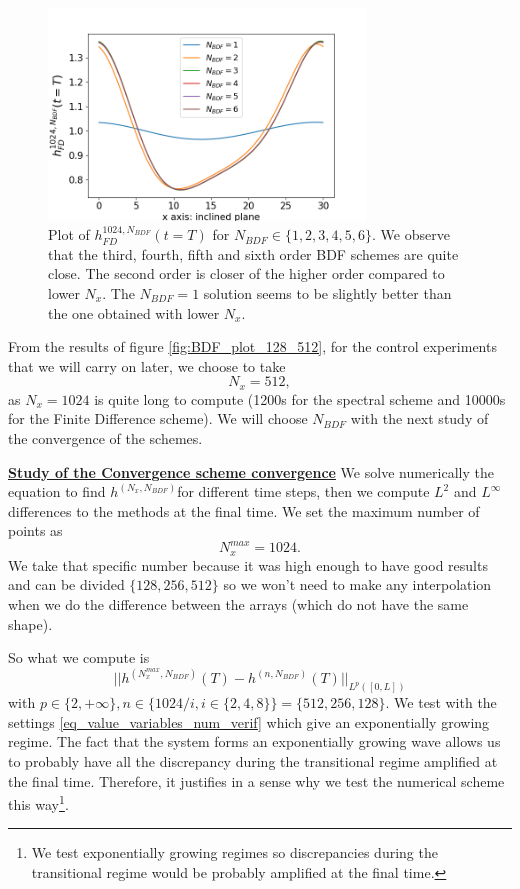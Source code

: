 \documentclass[12pt]{article}
\begin{document}
\begin{figure}[h]
\centering
\includegraphics[width=0.75\textwidth]{Verif_scheme/plot_FD_BDF_Nx_1024.png}
\caption{Plot of $h_{FD}^{1024, N_{BDF}}(t=T)$ for $N_{BDF} \in \{1, 2, 3, 4, 5, 6\}$.
We observe that the third, fourth, fifth and sixth order BDF schemes are quite close. The second order is closer of the higher order compared to lower $N_x$. The $N_{BDF}=1$ solution seems to be slightly better than the one obtained with lower $N_x$.}
\label{fig:BDF_plot_1024}
\end{figure}


 From the results of figure \ref{fig:BDF_plot_128_512}, for the control experiments that we will carry on later, we choose to take 
\begin{equation}
\boxed{
    N_x=512
    },
\end{equation}
as $N_x=1024$ is quite long to compute (1200s for the spectral scheme and 10000s for the Finite Difference scheme). 
We will choose $N_{BDF}$ with the next study of the convergence of the schemes.

\underline{\textbf{Study of the Convergence scheme convergence}}
We solve numerically the equation to find $h^{(N_x, N_{BDF})}$for different time steps, then we compute $L^2$ and $L^{\infty}$ differences to the methods at the final time. 
We set the maximum number of points as $$N_x^{max} = 1024.$$ We take that specific number because it was high enough to have good results and can be divided $\{128, 256, 512\}$ 
so we won't need to make any interpolation when we do the difference between the arrays (which do not have the same shape).
 
So what we compute is 
\begin{equation}\label{h_diff_convergence_rate}
    ||h^{(N_x^{max}, N_{BDF})}(T)-h^{(n, N_{BDF})}(T)||_{L^{p}([0,L])}
\end{equation}
with $p\in \{2, +\infty\},n\in \{1024/i, i\in \{2, 4, 8\}\} = \{512, 256, 128\}.$
We test with the settings \eqref{eq_value_variables_num_verif} which give an exponentially growing regime. The fact that
 the system forms an exponentially growing wave allows us to probably have all the discrepancy during the transitional
  regime amplified at the final time. Therefore, it justifies in a sense why we test the numerical scheme this 
  way\footnote{We test exponentially growing regimes so discrepancies during the transitional regime would be probably
   amplified at the final time.}.
\\
\end{document}
